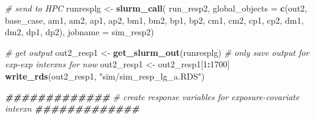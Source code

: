 \documentclass[12pt, twoside]{amherstthesis}
\newenvironment{Shaded}{\begin{snugshade}}{\end{snugshade}}
\newcommand{\AttributeTok}[1]{\textcolor[rgb]{0.13,0.29,0.53}{#1}}
\newcommand{\CommentTok}[1]{\textcolor[rgb]{0.56,0.35,0.01}{\textit{#1}}}
\newcommand{\DecValTok}[1]{\textcolor[rgb]{0.00,0.00,0.81}{#1}}
\newcommand{\DocumentationTok}[1]{\textcolor[rgb]{0.56,0.35,0.01}{\textbf{\textit{#1}}}}
\newcommand{\FunctionTok}[1]{\textcolor[rgb]{0.13,0.29,0.53}{\textbf{#1}}}
\newcommand{\NormalTok}[1]{#1}
\newcommand{\OtherTok}[1]{\textcolor[rgb]{0.56,0.35,0.01}{#1}}
\newcommand{\SpecialCharTok}[1]{\textcolor[rgb]{0.81,0.36,0.00}{\textbf{#1}}}
\newcommand{\StringTok}[1]{\textcolor[rgb]{0.31,0.60,0.02}{#1}}
\begin{document}
\begin{Shaded}
\begin{Highlighting}[]
\CommentTok{\# send to HPC}
\NormalTok{runresplg }\OtherTok{\textless{}{-}} \FunctionTok{slurm\_call}\NormalTok{(}
\NormalTok{  run\_resp2, }
  \AttributeTok{global\_objects =} \FunctionTok{c}\NormalTok{(}\StringTok{\textquotesingle{}out2\textquotesingle{}}\NormalTok{, }\StringTok{\textquotesingle{}base\_case\textquotesingle{}}\NormalTok{, }
                     \StringTok{\textquotesingle{}am1\textquotesingle{}}\NormalTok{, }\StringTok{\textquotesingle{}am2\textquotesingle{}}\NormalTok{, }\StringTok{\textquotesingle{}ap1\textquotesingle{}}\NormalTok{, }\StringTok{\textquotesingle{}ap2\textquotesingle{}}\NormalTok{, }
                     \StringTok{\textquotesingle{}bm1\textquotesingle{}}\NormalTok{, }\StringTok{\textquotesingle{}bm2\textquotesingle{}}\NormalTok{, }\StringTok{\textquotesingle{}bp1\textquotesingle{}}\NormalTok{, }\StringTok{\textquotesingle{}bp2\textquotesingle{}}\NormalTok{, }
                     \StringTok{\textquotesingle{}cm1\textquotesingle{}}\NormalTok{, }\StringTok{\textquotesingle{}cm2\textquotesingle{}}\NormalTok{, }\StringTok{\textquotesingle{}cp1\textquotesingle{}}\NormalTok{, }\StringTok{\textquotesingle{}cp2\textquotesingle{}}\NormalTok{, }
                     \StringTok{\textquotesingle{}dm1\textquotesingle{}}\NormalTok{, }\StringTok{\textquotesingle{}dm2\textquotesingle{}}\NormalTok{, }\StringTok{\textquotesingle{}dp1\textquotesingle{}}\NormalTok{, }\StringTok{\textquotesingle{}dp2\textquotesingle{}}\NormalTok{),}
  \AttributeTok{jobname =} \StringTok{\textquotesingle{}sim\_resp2\textquotesingle{}}\NormalTok{)}

\CommentTok{\# get output}
\NormalTok{out2\_resp1 }\OtherTok{\textless{}{-}} \FunctionTok{get\_slurm\_out}\NormalTok{(runresplg)}
\CommentTok{\# only save output for exp{-}exp interxns for now}
\NormalTok{out2\_resp1 }\OtherTok{\textless{}{-}}\NormalTok{ out2\_resp1[}\DecValTok{1}\SpecialCharTok{:}\DecValTok{1700}\NormalTok{]}
\FunctionTok{write\_rds}\NormalTok{(out2\_resp1, }\StringTok{"sim/sim\_resp\_lg\_a.RDS"}\NormalTok{)}
\end{Highlighting}
\end{Shaded}
\normalsize

\scriptsize
\begin{Shaded}
\begin{Highlighting}[]
\DocumentationTok{\#\#\#\#\#\#\#\#\#\#\#\#\#}
\CommentTok{\# create response variables for exposure{-}covariate interxn}
\DocumentationTok{\#\#\#\#\#\#\#\#\#\#\#\#\#}
\end{Highlighting}
\end{Shaded}
\normalsize
\end{document}
